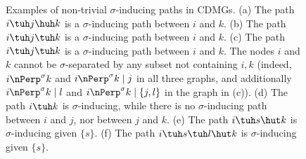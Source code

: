 \begin{figure}
  \caption{Examples of non-trivial $\sigma$-inducing paths in CDMGs. (a) The path $i \tuh j \huh k$ is a $\sigma$-inducing path between $i$ and $k$. (b) The path $i \tuh j \tuh k$ is a $\sigma$-inducing path between $i$ and $k$. (c) The path $i \tuh j \tuh k$ is a $\sigma$-inducing path between $i$ and $k$. The nodes $i$ and $k$ cannot be $\sigma$-separated by any subset not containing $i,k$ (indeed, $i \nPerp^\sigma k$ and $i \nPerp^\sigma k \mid j$ in all three graphs, and additionally $i \nPerp^\sigma k \mid l$ and $i \nPerp^\sigma k \mid \{j,l\}$ in the graph in (c)). (d) The path $i \tuh k$ is $\sigma$-inducing, while there is no $\sigma$-inducing path between $i$ and $j$, nor between $j$ and $k$. (e) The path $i \tuh s \hut k$ is $\sigma$-inducing given $\{s\}$. (f) The path $i \tuh s \tuh l \hut k$ is $\sigma$-inducing given $\{s\}$.\label{fig:sigma-inducing_path}}
\end{figure}

